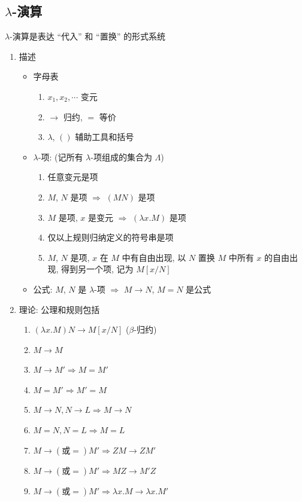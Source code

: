 \documentclass[11pt,a4paper,twocolumn,fleqn]{article} %
\begin{document}
\subsection[λ-演算]{$\lambda$-演算} %
\label{sub:lambda_cal}
$\lambda$-演算是表达 ``代入'' 和 ``置换'' 的形式系统
\begin{enumerate}
	\item 描述
	\begin{itemize}
		\item 字母表
		\begin{enumerate}
			\item $x_1, x_2,\cdots$ 变元
			\item $\to$ 归约, $=$ 等价
			\item $\lambda$, $()$ 辅助工具和括号
		\end{enumerate}
		\item $\lambda$-项: 
		(记所有 $\lambda$-项组成的集合为 $\Lambda$)
		\begin{enumerate}
			\item 任意变元是项
			\item $M$, $N$ 是项 $\Rightarrow$ $(MN)$ 是项
			\item $M$ 是项, $x$ 是变元 $\Rightarrow$ $(\lambda x. M)$ 是项
			\item 仅以上规则归纳定义的符号串是项
			\item $M$, $N$ 是项, $x$ 在 $M$ 中有自由出现, 
			以 $N$ 置换 $M$ 中所有 $x$ 的自由出现, 得到另一个项, 
			记为 $M[x/N]$
		\end{enumerate}
		\item 公式: $M$, $N$ 是 $\lambda$-项 $\Rightarrow$ 
			$M\to N$, $M = N$ 是公式
	\end{itemize}
	\item 理论: 公理和规则包括
	\begin{enumerate}
		\item $(\lambda x. M)N \to M[x/N]$ \quad($\beta$-归约)
		\item $M\to M$
		\item $M\to M'\Rightarrow M=M'$
		\item $M = M' \Rightarrow M'=M$
		\item $M\to N, N\to L \Rightarrow M\to N$
		\item $M=N, N=L \Rightarrow M=L$
		\item $M\to (\mbox{或}=) M' \Rightarrow ZM\to ZM'$
		\item $M\to (\mbox{或}=) M' \Rightarrow MZ\to M'Z$
		\item $M\to (\mbox{或}=) M' \Rightarrow \lambda x. M\to \lambda x. M'$

\end{enumerate}
\end{enumerate}
\end{document}
